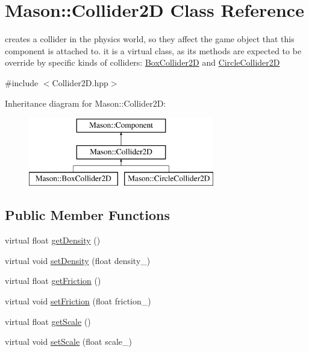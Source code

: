 \hypertarget{class_mason_1_1_collider2_d}{}\section{Mason\+:\+:Collider2D Class Reference}
\label{class_mason_1_1_collider2_d}


creates a collider in the physics world, so they affect the game object that this component is attached to. it is a virtual class, as its methods are expected to be override by specific kinds of colliders\+: \hyperlink{class_mason_1_1_box_collider2_d}{Box\+Collider2D} and \hyperlink{class_mason_1_1_circle_collider2_d}{Circle\+Collider2D}  




{\ttfamily \#include $<$Collider2\+D.\+hpp$>$}

Inheritance diagram for Mason\+:\+:Collider2D\+:\begin{figure}[H]
\begin{center}
\leavevmode
\includegraphics[height=3.000000cm]{class_mason_1_1_collider2_d}
\end{center}
\end{figure}
\subsection*{Public Member Functions}
\begin{DoxyCompactItemize}
\item 
virtual float \hyperlink{class_mason_1_1_collider2_d_aeb03667bfd9e1006fd9076199af786e4}{get\+Density} ()
\item 
virtual void \hyperlink{class_mason_1_1_collider2_d_a077061bfa5c7a8c80e78042f9a421a49}{set\+Density} (float density\+\_\+)
\item 
virtual float \hyperlink{class_mason_1_1_collider2_d_a51dc3e85d605474a71c3b8c7949affef}{get\+Friction} ()
\item 
virtual void \hyperlink{class_mason_1_1_collider2_d_aa2e1d4505ee65f9a6fa7490bc50bd092}{set\+Friction} (float friction\+\_\+)
\item 
virtual float \hyperlink{class_mason_1_1_collider2_d_a370216fb8ccfe760adfc3365ac41ff8e}{get\+Scale} ()
\item 
virtual void \hyperlink{class_mason_1_1_collider2_d_a08f3b34369aaa53d89c2d16b37319795}{set\+Scale} (float scale\+\_\+)
\end{DoxyCompactItemize}
